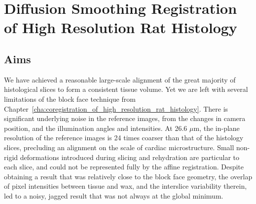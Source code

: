 \chapter{Diffusion Smoothing Registration of High Resolution Rat Histology} %
\label{cha:diffusion_smoothing_registration_of_high_resolution_rat_histology}

\dblspace
\begin{quote}{\em }\end{quote}

\section{Aims} %
\label{sec:aims}
  We have achieved a reasonable large-scale alignment of the great majority of histological slices to form a consistent tissue volume. Yet we are left with several limitations of the block face technique from Chapter~\ref{cha:coregistration_of_high_resolution_rat_histology}. There is significant underlying noise in the reference images, from the changes in camera position, and the illumination angles and intensities. At 26.6 $\mu$m, the in-plane resolution of the reference images is 24 times coarser than that of the histology slices, precluding an alignment on the scale of cardiac microstructure. Small non-rigid deformations introduced during slicing and rehydration are particular to each slice, and could not be represented fully by the affine registration. Despite obtaining a result that was relatively close to the block face geometry, the overlap of pixel intensities between tissue and wax, and the interslice variability therein, led to a noisy, jagged result that was not always at the global minimum.
    
